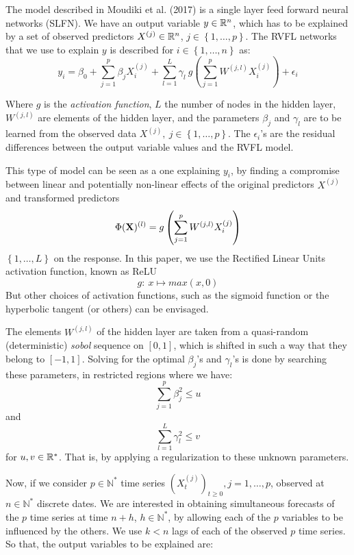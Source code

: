 The model described in Moudiki et al. (2017) is a single layer feed forward neural networks (SLFN). We have an output variable $y \in \mathbb{R}^n$, which has to be explained by a set of observed predictors $X^{(j)} \in \mathbb{R}^n$, $j \in \left\lbrace 1, \ldots,
p\right\rbrace$. The RVFL networks that we use to explain $y$ is described for $i \in \left\lbrace 1, \ldots, n\right\rbrace$ as:
$$
y_i = \beta_0 + \sum_{j = 1}^p \beta_j X_i^{(j)} + \sum_{l = 1}^L \gamma_l \:
g\left(\sum_{j = 1}^p W^{(j, l)} X_i^{(j)}\right) + \epsilon_i
$$

\medskip

Where $g$ is the \textit{activation function}, $L$ the number of nodes in the hidden
layer, $W^{(j, l)}$ are elements of the hidden layer, and the parameters
$\beta_j$ and $\gamma_l$ are to be learned from the observed data $X^{(j)}, \: j
\in \left\lbrace 1, \ldots, p\right\rbrace$. The $\epsilon_i$'s are the residual
differences between the output variable values and the RVFL model.

\medskip

This type of model can be seen as a one explaining $y_i$, by finding a
compromise between linear and potentially non-linear effects of the original
predictors $X^{(j)}$ and transformed predictors
$$
\Phi({\bf X})^{(l)}= g\left(\sum_{j = 1}^p W^{(j, l)} X_i^{(j)}\right)
$$
$\left \lbrace 1, \ldots, L\right\rbrace$ on the response. In this paper, we use the Rectified Linear Units activation function, known as ReLU
$$
g: \: x \mapsto max(x, 0)
$$
But other choices of activation functions, such as the sigmoid function or the hyperbolic tangent (or others) can be envisaged.

\medskip

The elements $W^{(j, l)}$ of the hidden layer are taken from a quasi-random (deterministic) \textit{sobol} sequence on $[0, 1]$, which is shifted in such a way that they belong to $[-1, 1]$. Solving for the optimal $\beta_j$'s and $\gamma_l$'s is done by searching these parameters,  in restricted regions where we have:
$$
\sum_{j=1}^p \beta_j^2  \leq u
$$
and
$$
\sum_{l=1}^L
\gamma_l^2 \leq v
$$ for $u, v \in \mathbb{R}^*$. That is, by applying a regularization to these unknown parameters.


\medskip

Now, if we consider $p \in \mathbb{N}^*$ time series $(X_t^{(j)})_{t \geq 0}, j = 1, \ldots, p$,
observed at $n \in \mathbb{N}^*$ discrete dates. We are interested in
obtaining simultaneous forecasts of the $p$ time series at time $n+h$, $h \in
\mathbb{N}^*$, by allowing each of the $p$ variables to be influenced by the
others. We use $k < n$ lags of each of the observed $p$ time
series. So that, the output variables to be explained are:

